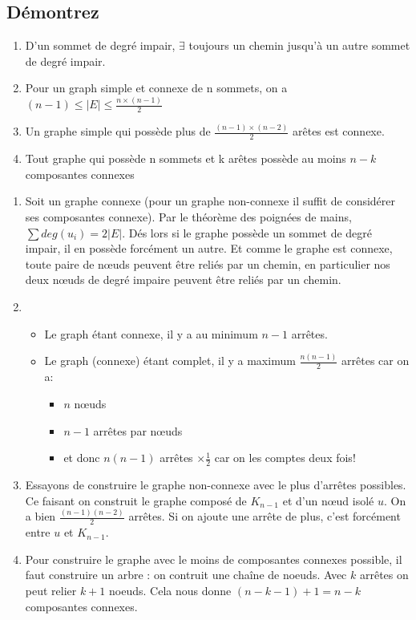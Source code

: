 \subsection{Démontrez}
\begin{enumerate}
\item{D'un sommet de degré impair, $\exists$ toujours un chemin jusqu'à un autre sommet de degré impair.}
\item{Pour un graph simple et connexe de n sommets, on a $(n-1) \leq |E| \leq \frac{n \times (n-1)}{2}$}
\item{Un graphe simple qui possède plus de $\frac{(n-1) \times (n-2)}{2}$ arêtes est connexe.}
\item{Tout graphe qui possède n sommets et k arêtes possède au moins $n-k$ composantes connexes}
\end{enumerate}

\begin{solution}
\begin{enumerate}
\item{Soit un graphe connexe (pour un graphe non-connexe il suffit de considérer ses composantes connexe). Par le théorème des poignées de mains, $\sum deg(u_i) = 2 |E|$. Dés lors si le graphe possède un sommet de degré impair, il en possède forcément un autre. Et comme le graphe est connexe, toute paire de nœuds peuvent être reliés par un chemin, en particulier nos deux nœuds de degré impaire peuvent être reliés par un chemin.}
\item{
	\begin{itemize}
	\item Le graph étant connexe, il y a au minimum $n-1$ arrêtes.
	\item Le graph (connexe) étant complet, il y a maximum $\frac{n (n-1)}{2}$ arrêtes car on a:
		\begin{itemize}
		\item $n$ nœuds
		\item $n-1$ arrêtes par nœuds
		\item et donc $n (n-1)$ arrêtes $\times \frac{1}{2}$ car on les comptes deux fois!
		\end{itemize}
	\end{itemize}	
}
\item{ Essayons de construire le graphe non-connexe avec le plus d'arrêtes possibles. Ce faisant on construit le graphe composé de $K_{n-1}$ et d'un nœud isolé $u$. On a bien $\frac{(n-1)(n-2)}{2}$ arrêtes. Si on ajoute une arrête de plus, c'est forcément entre $u$ et $K_{n-1}$.	
	}
\item{Pour construire le graphe avec le moins de composantes connexes possible, il faut construire un arbre : on contruit une chaîne de noeuds. Avec $k$ arrêtes on peut relier $k+1$ noeuds. Cela nous donne $(n-k-1)+1=n-k$ composantes connexes.}
\end{enumerate}
\end{solution}

